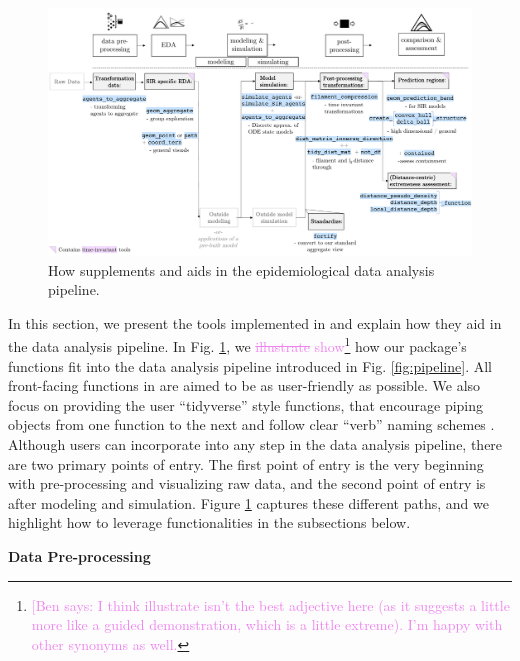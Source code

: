 \documentclass[
  shortnames]{jss}
\begin{document}
\afterpage{\clearpage}
\begin{figure}
    \centering
    \includegraphics[width = 1\textwidth]{images/pipeline2_1.pdf}
    \caption{How  supplements and aids in the epidemiological data analysis pipeline.}
    \label{fig:pipeline2}
\end{figure}

In this section, we present the tools implemented in 
and explain how they aid in the data analysis pipeline. In Fig.
\ref{fig:pipeline2}, we
\textcolor{violet}{\sout{illustrate} show}\footnote{\textcolor{violet}{[Ben says: I think illustrate isn't the best adjective here (as it suggests a little more like a guided demonstration, which is a little extreme). I'm happy with other synonyms as well.}}
how our package's functions fit into the data analysis pipeline
introduced in Fig. \ref{fig:pipeline}. All front-facing functions in
 are aimed to be as user-friendly as possible. We also
focus on providing the user ``tidyverse'' style functions, that
encourage piping objects from one function to the next and follow clear
``verb'' naming schemes \citep{Wickham2019}. Although users can
incorporate  into any step in the data analysis
pipeline, there are two primary points of entry. The first point of
entry is the very beginning with pre-processing and visualizing raw
data, and the second point of entry is after modeling and simulation.
Figure \ref{fig:pipeline2} captures these different paths, and we
highlight how to leverage  functionalities in the
subsections below.

\textbf{Data Pre-processing}
\end{document}
